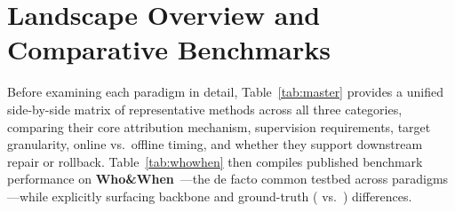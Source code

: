 \section{Landscape Overview and Comparative Benchmarks}\label{sec:overview}

Before examining each paradigm in detail, Table~\ref{tab:master} provides a unified side-by-side matrix of representative methods across all three categories, comparing their core attribution mechanism, supervision requirements, target granularity, online vs.\ offline timing, and whether they support downstream repair or rollback. Table~\ref{tab:whowhen} then compiles published benchmark performance on \textbf{Who\&When}~\citep{zhang2025who}---the de facto common testbed across paradigms---while explicitly surfacing backbone and ground-truth ( vs.\ ) differences.

